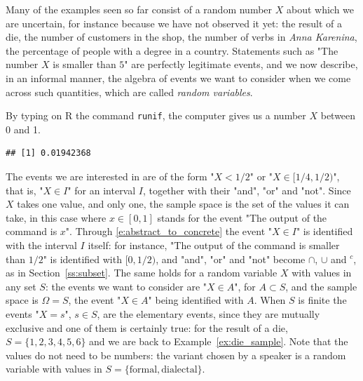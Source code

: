 Many of the examples seen so far consist of a random number $X$ about which we are uncertain, for instance because we have not observed it yet: the result of a die, the number of customers in the shop, the number of verbs in \emph{Anna Karenina}, the percentage of people with a degree in a country. Statements such as "The number $X$ is smaller than $5$" are perfectly legitimate events, and we now describe, in an informal manner, the algebra of events we want to consider when we come across such quantities, which are called \emph{random variables}. 

\begin{model}
	\label{ex:one_rv}
	\label{ex:unif}
	By typing on R the command \texttt{runif}, the computer gives us a number $X$ between 0 and 1. 
\begin{knitrout}
\color{fgcolor}\begin{kframe}
\begin{alltt}
\hldef{(}\hldef{)}
\end{alltt}
\begin{verbatim}
## [1] 0.01942368
\end{verbatim}
\end{kframe}
\end{knitrout}
	The events we are interested in are of the form "$X < 1/2$" or "$X \in [1/4, 1/2)$", that is, "$X \in I$" for an interval $I$, together with their "and", "or" and "not". Since $X$ takes one value, and only one, the sample space is the set of the values it can take, in this case 
	where $x \in [0, 1]$ stands for the event "The output of the command is $x$". Through \eqref{e:abstract_to_concrete} the event "$X \in I$" is identified with the interval $I$ itself: for instance, "The output of the command is smaller than $1/2$" is identified with $[0, 1/2)$, and "and", "or" and "not" become $\cap$, $\cup$ and ${}^c$, as in Section~\ref{ss:subset}. 
	The same holds for a random variable $X$ with values in any set $S$: the events we want to consider are "$X \in A$", for $A \subset S$, and the sample space is $\Omega = S$, the event "$X \in A$" being identified with $A$. When $S$ is finite the events "$X = s$", $s \in S$, are the elementary events, since they are mutually exclusive and one of them is certainly true: for the result of a die, $S = \{1, 2, 3, 4, 5, 6\}$ and we are back to Example~\ref{ex:die_sample}. Note that the values do not need to be numbers: the variant chosen by a speaker is a random variable with values in $S = \{\text{formal}, \text{dialectal}\}$. 
\end{model}

